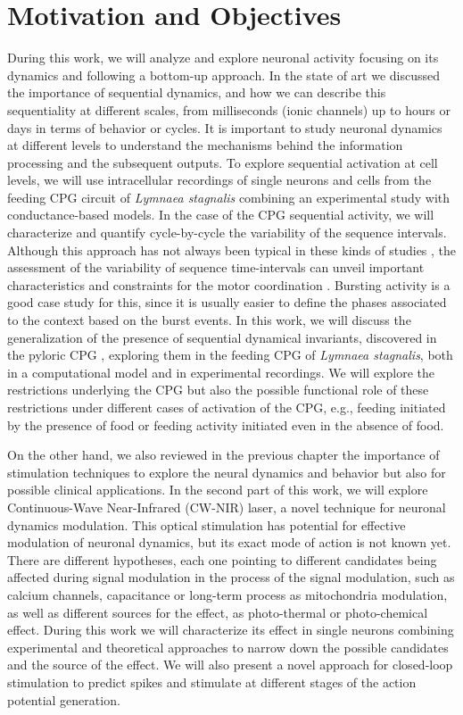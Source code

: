 \chapter{Motivation and Objectives}\label{c-review}
During this work, we will analyze and explore neuronal activity focusing on its dynamics and following a bottom-up approach. In the state of art we discussed the importance of sequential dynamics, and how we can describe this sequentiality at different scales, from milliseconds (ionic channels) up to hours or days in terms of behavior or cycles. It is important to study neuronal dynamics at different levels to understand the mechanisms behind the information processing and the subsequent outputs. To explore sequential activation at cell levels, we will use intracellular recordings of single neurons and cells from the feeding CPG circuit of \textit{Lymnaea stagnalis} combining an experimental study with conductance-based models. In the case of the CPG sequential activity, we will characterize and quantify cycle-by-cycle the variability of the sequence intervals. Although this approach has not always been typical in these kinds of studies \parencite{anwar_interanimal_2022}, the assessment of the variability of sequence time-intervals can unveil important characteristics and constraints for the motor coordination \parencite{elices_robust_2019}. Bursting activity is a good case study for this, since it is usually easier to define the phases associated to the context based on the burst events. In this work, we will discuss the generalization of the presence of sequential dynamical invariants, discovered in the pyloric CPG \parencite{elices_robust_2019}, exploring them in the feeding CPG of \textit{Lymnaea stagnalis}, both in a computational model and in experimental recordings. We will explore the restrictions underlying the CPG but also the possible functional role of these restrictions under different cases of activation of the CPG, e.g., feeding initiated by the presence of food or feeding activity initiated even in the absence of food. 

On the other hand, we also reviewed in the previous chapter the importance of stimulation techniques to explore the neural dynamics and behavior but also for possible clinical applications. In the second part of this work, we will explore Continuous-Wave Near-Infrared (CW-NIR) laser, a novel technique for neuronal dynamics modulation. This optical stimulation has potential for effective modulation of neuronal dynamics, but its exact mode of action is not known yet. There are different hypotheses, each one pointing to different candidates being affected during signal modulation in the process of the signal modulation, such as calcium channels, capacitance or long-term process as mitochondria modulation, as well as different sources for the effect, as photo-thermal or photo-chemical effect. During this work we will characterize its effect in single neurons combining experimental and theoretical approaches to narrow down the possible candidates and the source of the effect. We will also present a novel approach for closed-loop stimulation to predict spikes and stimulate at different stages of the action potential generation. 

